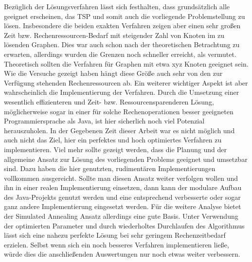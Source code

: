 Bezüglich der Lösungsverfahren lässt sich festhalten, dass grundsätzlich alle geeignet erscheinen, das TSP und somit auch die vorliegende Problemstellung zu lösen. Insbesondere die beiden exakten Verfahren zeigen aber einen sehr großen Zeit bzw. Rechenressourcen-Bedarf mit steigender Zahl von Knoten im zu lösenden Graphen. Dies war auch schon nach der theoretischen Betrachtung zu erwarten, allerdings wurden die Grenzen noch schneller erreicht, als vermutet. Theoretisch sollten die Verfahren für Graphen mit etwa xyz Knoten geeignet sein. Wie die Versuche gezeigt haben hängt diese Größe auch sehr von den zur Verfügung stehenden Rechenressourcen ab. Ein weiterer wichtiger Aspekt ist aber wahrscheinlich die Implementierung der Verfahren. Durch die Umsetzung einer wesentlich effizienteren und Zeit- bzw. Ressourcensparenderen Lösung, möglicherweise sogar in einer für solche Rechenoperationen besser geeigneten Programmiersprache als Java, ist hier sicherlich noch viel Potenzial herauszuholen. In der Gegebenen Zeit dieser Arbeit war es nicht möglich und auch nicht das Ziel, hier ein perfektes und hoch optimiertes Verfahren zu implementieren. Viel mehr sollte gezeigt werden, dass die Planung und der allgemeine Ansatz zur Lösung des vorliegenden Problems geeignet und umsetzbar sind. Dazu haben die hier genutzten, rudimentären Implementierungen vollkommen ausgereicht. Sollte man diesen Ansatz weiter verfolgen wollen und ihn in einer realen Implementierung einsetzen, dann kann der modulare Aufbau des Java-Projekts genutzt werden und eine entsprechend verbesserte oder sogar ganz andere Implementierung eingesetzt werden. Für die weitere Analyse bietet der Simulated Annealing Ansatz allerdings eine gute Basis. Unter Verwendung der optimierten Parameter und durch wiederholtes Durchlaufen des Algorithmus lässt sich eine nahezu perfekte Lösung bei sehr geringem Rechenzeitbedarf erzielen. Selbst wenn sich ein noch besseres Verfahren implementieren ließe, würde dies die anschließenden Auswertungen nur noch etwas weiter verbessern.

